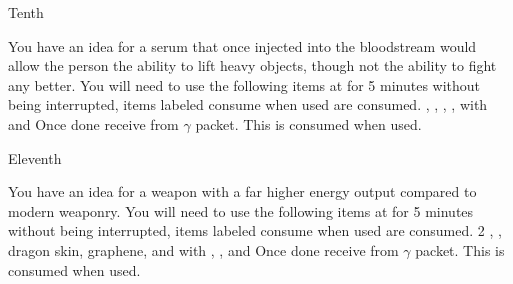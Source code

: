 \documentclass[greennotebook]{guildcamp3} %
\begin{document}
\begin{page}{Tenth}
	
	You have an idea for a serum that once injected into the bloodstream would allow the person the ability to lift heavy objects, though not the ability to fight any better.
	You will need to use the following items at \sSciWorkbench{} for 5 minutes without being interrupted, items labeled consume when used are consumed.
	\iCompoundNine{}, \iBloodPlasma{}, \iWerewolfFang{}, \iZirconia, \iGraphiteLube with \iMagnet{} and \iCentrifuge{}
	Once done receive \iSteroids{} from $\gamma$ packet. This is consumed when used. 
	
\end{page}

\begin{page}{Eleventh}
	
	You have an idea for a weapon with a far higher energy output compared to modern weaponry.
	You will need to use the following items at \sSciWorkbench{} for 5 minutes without being interrupted, items labeled consume when used are consumed.
	2 \iScrapMetal{}, \iNiobiumCarbide{}, dragon skin, graphene, and \iGraphiteLube with \iDiamondDrill{}, \iMultitool{}, and \iMonoBlade{}
	Once done receive \iUpgradedTechGun{} from $\gamma$ packet. This is consumed when used. 
	
\end{page}




\endnotebook
\end{document}
